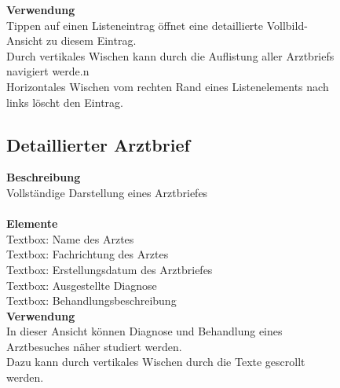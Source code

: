 \documentclass[a4paper]{scrreprt}
\begin{document}
\begin{figure}
\begin{minipage}[t][][b]{0.65\textwidth}
\textbf{Verwendung}\\
{Tippen auf einen Listeneintrag öffnet eine detaillierte Vollbild-Ansicht zu diesem Eintrag.}\\
{Durch vertikales Wischen kann durch die Auflistung aller \glspl{Arztbrief} navigiert werde.n}\\
{Horizontales Wischen vom rechten Rand eines Listenelements nach links löscht den Eintrag.}\\
\newline
\newline
\newline

\subsection*{Detaillierter \gls{Arztbrief}}
\textbf{Beschreibung}\\
{Vollständige Darstellung eines Arztbriefes}\\
~\\
\textbf{Elemente}\\
{Textbox: Name des Arztes}\\
{Textbox: Fachrichtung des Arztes}\\
{Textbox: Erstellungsdatum des Arztbriefes}\\
{Textbox: Ausgestellte Diagnose}\\
{Textbox: Behandlungsbeschreibung}\\

\textbf{Verwendung}\\
{In dieser Ansicht können Diagnose und Behandlung eines Arztbesuches näher studiert werden. }\\
{Dazu kann durch vertikales Wischen durch die Texte gescrollt werden.}
\end{minipage}%
\end{figure}

\newpage
\end{document}
